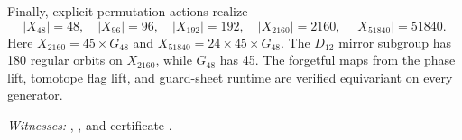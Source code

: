 Finally, explicit permutation actions realize
\[
|X_{48}|=48,\quad |X_{96}|=96,\quad |X_{192}|=192,
\quad |X_{2160}|=2160,\quad |X_{51840}|=51840.
\]
Here $X_{2160}=45\times G_{48}$ and
$X_{51840}=24\times45\times G_{48}$. The $D_{12}$ mirror subgroup has 180
regular orbits on $X_{2160}$, while $G_{48}$ has 45. The forgetful maps from
the phase lift, tomotope flag lift, and guard-sheet runtime are verified
equivariant on every generator.

\emph{Witnesses:}
,
, and certificate
.

